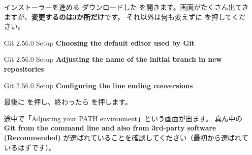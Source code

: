 \begin{step}{インストーラーを進める}
ダウンロードした  を開きます。画面がたくさん出てきますが、\textbf{変更するのは3か所だけ}です。
それ以外は何も変えずに  を押してください。

\begin{winwin}[0.78\linewidth]{Git 2.56.0 Setup}
\textbf{Choosing the default editor used by Git}\par\smallskip
{}\par
{}
\end{winwin}

\begin{winwin}[0.78\linewidth]{Git 2.56.0 Setup}
\textbf{Adjusting the name of the initial branch in new repositories}\par\smallskip
{}
\hspace*{2em}\par
{}
\end{winwin}

\begin{winwin}[0.78\linewidth]{Git 2.56.0 Setup}
\textbf{Configuring the line ending conversions}\par\smallskip
{}
\end{winwin}

最後に  を押し、終わったら  を押します。
\end{step}

\begin{tip}
途中で「Adjusting your PATH environment」という画面が出ます。
真ん中の \textbf{Git from the command line and also from 3rd-party software (Recommended)} が選ばれていることを確認してください（最初から選ばれているはずです）。
\end{tip}

